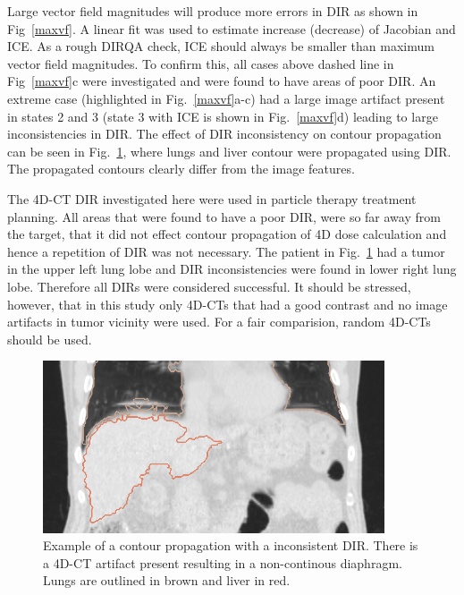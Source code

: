 Large vector field magnitudes will produce more errors in DIR as shown in Fig~\ref{maxvf}. A linear fit was used to estimate increase (decrease) of Jacobian and ICE. 
As a rough DIRQA check, ICE should always be smaller than maximum vector field magnitudes. To confirm this, all cases above dashed line in Fig~\ref{maxvf}c 
were investigated and were found to have areas of poor DIR. An extreme case (highlighted in Fig.~\ref{maxvf}a-c)
had a large image artifact present in states 2 and 3 (state 3 with ICE is shown in Fig.~\ref{maxvf}d) leading to large inconsistencies in DIR. 
The effect of DIR inconsistency on contour propagation can be seen in Fig.~\ref{contourPropagation},
where lungs and liver contour were propagated using DIR. The propagated contours clearly differ from the image features.

The 4D-CT DIR investigated here were used in particle therapy treatment planning. All areas that were found to have a poor DIR, were so far away from the target, that it did not effect contour propagation of 4D dose calculation and
hence a repetition of DIR was not necessary.
The patient in Fig.~\ref{contourPropagation} had a tumor in the upper left lung lobe and DIR inconsistencies were found in lower right lung lobe. 
Therefore all DIRs were considered successful. It should be stressed, however, that in this study only 4D-CTs that had a good contrast and no image artifacts in tumor vicinity were used. For a 
fair comparision, random 4D-CTs should be used.

\begin{figure}[H]
	\begin{center}		
		\includegraphics[width=0.9\textwidth]{./Vmm/Images/ContourPropagation/contourPropagation.png}
		\caption{Example of a contour propagation with a inconsistent DIR. There is a 4D-CT artifact present resulting in a non-continous diaphragm. Lungs are outlined in brown and liver in red.}
		\label{contourPropagation}
	\end{center}
\end{figure}


